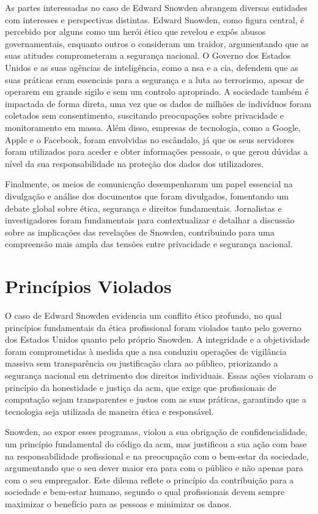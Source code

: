 \documentclass[a4paper,12pt]{article}
\begin{document}
As partes interessadas no caso de Edward Snowden abrangem diversas entidades com interesses e perspectivas distintas. Edward Snowden, como figura central, é percebido por alguns como um herói ético que revelou e expôs abusos governamentais, enquanto outros o consideram um traidor, argumentando que as suas atitudes comprometeram a segurança nacional. O Governo dos Estados Unidos e as suas agências de inteligência, como a \acrshort{nsa} e a \acrshort{cia}, defendem que as suas práticas eram essenciais para a segurança e a luta ao terrorismo, apesar de operarem em grande sigilo e sem um controlo apropriado.
A sociedade também é impactada de forma direta, uma vez que os dados de milhões de indivíduos foram coletados sem consentimento, suscitando preocupações sobre privacidade e monitoramento em massa. Além disso, empresas de tecnologia, como a Google, Apple e o Facebook, foram envolvidas no escândalo, já que os seus servidores foram utilizados para aceder e obter informações pessoais, o que gerou dúvidas a nível da sua responsabilidade na proteção dos dados dos utilizadores.

Finalmente, os meios de comunicação desempenharam um papel essencial na divulgação e análise dos documentos que foram divulgados, fomentando um debate global sobre ética, segurança e direitos fundamentais. Jornalistas e investigadores foram fundamentais para contextualizar e detalhar a discussão sobre as implicações das revelações de Snowden, contribuindo para uma compreensão mais ampla das tensões entre privacidade e segurança nacional.


\section{Princípios Violados}

O caso de Edward Snowden evidencia um conflito ético profundo, no qual princípios fundamentais da ética profissional foram violados tanto pelo governo dos Estados Unidos quanto pelo próprio Snowden. A integridade e a objetividade foram comprometidas à medida que a \acrshort{nsa} conduziu operações de vigilância massiva sem transparência ou justificação clara ao público, priorizando a segurança nacional em detrimento dos direitos individuais. Essas ações violaram o princípio da honestidade e justiça da \acrshort{acm}, que exige que profissionais de computação sejam transparentes e justos com as suas práticas, garantindo que a tecnologia seja utilizada de maneira ética e responsável.

Snowden, ao expor esses programas, violou a sua obrigação de confidencialidade, um princípio fundamental do código da \acrshort{acm}, mas justificou a sua ação com base na responsabilidade profissional e na preocupação com o bem-estar da sociedade, argumentando que o seu dever maior era para com o público e não apenas para com o seu empregador. Este dilema reflete o princípio da contribuição para a sociedade e bem-estar humano, segundo o qual profissionais devem sempre maximizar o benefício para as pessoas e minimizar os danos.
\end{document}
